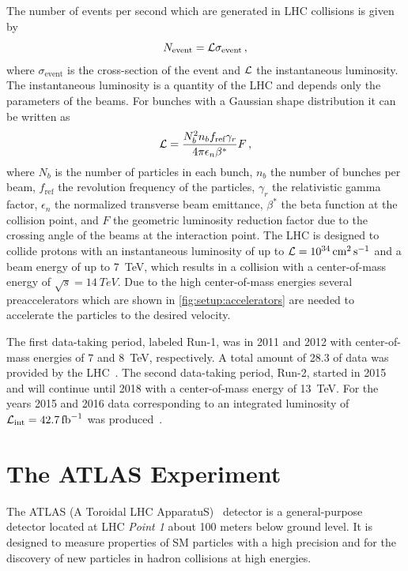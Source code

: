 The number of events per second which are generated in LHC collisions is given by
\begin{equation}
    \label{eq:lumi:def}
    N_\text{event} = \mathcal{L} \sigma_\text{event} \,,
\end{equation}
where $\sigma_\text{event}$ is the cross-section of the event and $\mathcal{L}$ the instantaneous luminosity.
The instantaneous luminosity is a quantity of the LHC and depends only the parameters of the beams.
For bunches with a Gaussian shape distribution it can be written as~\cite{LHC}
\begin{equation}
    \label{eq:lumi:dependencies}
    \mathcal{L} = \frac{N_b^2 n_b f_\text{ref} \gamma_r}{4 \pi \epsilon_n \beta^*} F \,,
\end{equation}
where $N_b$ is the number of particles in each bunch, $n_b$ the number of bunches per beam, $f_\text{ref}$ the revolution
frequency of the particles, $\gamma_r$ the relativistic gamma factor, $\epsilon_n$ the normalized transverse beam emittance,
$\beta^*$ the beta function at the collision point, and $F$ the geometric luminosity reduction factor
due to the crossing angle of the beams at the interaction point.
The LHC is designed to collide protons with an instantaneous luminosity of up to $\lumi = \SI{e34}{\cm\squared\per\second}$
and a beam energy of up to \SI{7}{\TeV}, which results in a collision with a center-of-mass energy of
$\sqrt{s} = \SI{14}{TeV}$.
Due to the high center-of-mass energies several preaccelerators which are shown in \cref{fig:setup:accelerators}
are needed to accelerate the particles to the desired velocity.

The first data-taking period, labeled Run-1, was in 2011 and 2012 with center-of-mass energies of $7$ and
\SI{8}{\TeV}, respectively.
A total amount of \SI{28.3}{\invfb} of data was provided by the LHC~\cite{PublicLumiRun1}.
The second data-taking period, Run-2, started in 2015 and will continue until 2018 with a center-of-mass energy of \SI{13}{TeV}.
For the years 2015 and 2016 data corresponding to an integrated luminosity of $\lumi_\text{int} = \SI{42.7}{\invfb}$ was produced~\cite{PublicLumiRun2}.

\section{The ATLAS Experiment}\label{sec:setup:atlas}

The ATLAS (A Toroidal LHC ApparatuS)~\cite{ATLAS} detector is a general-purpose detector located at LHC \emph{Point 1}
about 100 meters below ground level.
It is designed to measure properties of SM particles with a high precision and for the discovery of new particles
in hadron collisions at high energies.

